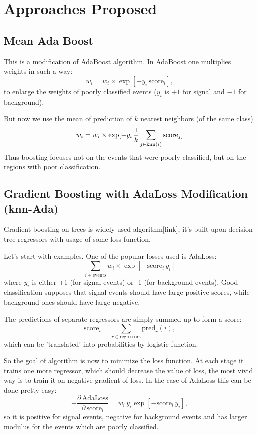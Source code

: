 \documentclass{JINST}
\theoremstyle{definition}
\theoremstyle{remark}
\begin{document}
\section{Approaches Proposed}

\subsection{Mean Ada Boost}

This is a modification of AdaBoost algorithm. In AdaBoost one multiplies weights in such a way:
\[
	w_i = w_i \times \exp[-y_i \, \text{score}_i],
\]
to enlarge the weights of poorly classified events ($y_i$ is $+1$ for signal and $-1$ for background).

But now we use the mean of prediction of $k$ nearest neighbors (of the same class)
\[
	w_i = w_i \times \exp[-y_i \, \dfrac{1}{k} \sum_{j \in \text{knn}(i)} \text{score}_j]
\]
Thus boosting focuses not on the events that were poorly classified, but on the regions with poor classification.


\subsection{Gradient Boosting with AdaLoss Modification (knn-Ada)}

\def\score{\text{score}}
\def\knn{\text{knn}}
\def\FL{\text{FL}}

Gradient boosting on trees is widely used algorithm[link], it's built upon decision tree regressors with usage of some loss function. 

Let's start with examples. One of the popular losses used is AdaLoss:
\[
	\sum_{i \in \text{events}} w_i \times \exp [- \score_i \, y_i] 
\]
where $y_i$ is either +1 (for signal events) or -1 (for background events). Good classification supposes that signal events should have large positive scores, while background ones should have large negative.

The predictions of separate regressors are simply summed up to form a score:
\[
	\score_i = \sum_{r \in \text{regressors}} \text{pred}_r(i),
\]
which can be 'translated' into probabilities by logistic function.

So the goal of algorithm is now to minimize the loss function. At each stage it trains one more regressor, which should decrease the value of loss, the most vivid way is to train it on negative gradient of loss. In the case of AdaLoss this can be done pretty easy:
\[
	-\dfrac{\partial \, \text{AdaLoss}}{\partial \, \score_i} = w_i \, y_i \exp[- \score_i \, y_i],
\]
so it is positive for signal events, negative for background events and has larger modulus for the events which are poorly classified.
\end{document}
